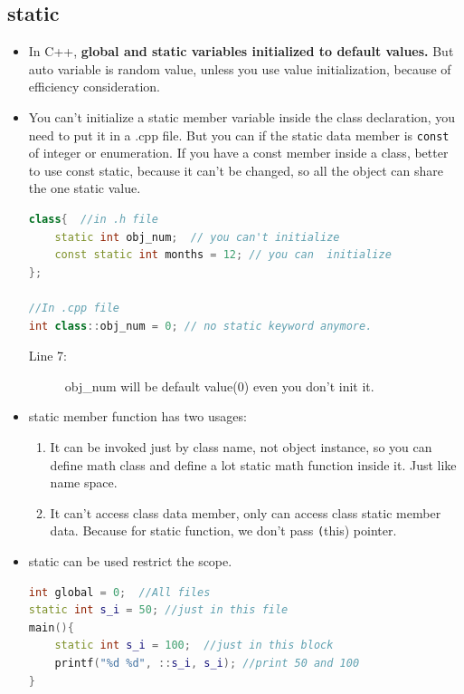 \documentclass[a4paper,11pt,twoside]{book}
\begin{document}
\subsection{static}
\begin{itemize}
	\item In C++, \textbf{global and static variables initialized to default values.}  But auto variable is random value, unless you use value initialization, because of efficiency consideration. 
	
	\item You can't initialize a static member variable inside the class declaration, you need to put it in a .cpp file.   But you can if the static data member is \texttt{const} of integer or enumeration. If you have a const member inside a class, better to use const static, because it can't be changed, so all the object can share the one static value.
\begin{lstlisting}[frame=single, language=c++]
class{  //in .h file
	static int obj_num;  // you can't initialize
	const static int months = 12; // you can  initialize
};
	
//In .cpp file
int class::obj_num = 0; // no static keyword anymore.

\end{lstlisting}
\begin{description}
	\item[Line 7:] obj\_num will be default value(0) even you don't init it.
\end{description}
	
	\item static member function has two usages:
	\begin{enumerate}
		\item It can be invoked just by class name, not object instance, so you can define math class and define a lot static math function inside it.  Just like name space.
		
		\item It can't access class data member, only can access class static member data. Because for static function, we don't pass \texttt(this) pointer.
	\end{enumerate}
	
	\item static can be used restrict the scope.
\begin{lstlisting}[frame=single, language=c++]
int global = 0;  //All files
static int s_i = 50; //just in this file
main(){
	static int s_i = 100;  //just in this block
	printf("%d %d", ::s_i, s_i); //print 50 and 100
}
\end{lstlisting}
\begin{description}


\end{description}
\end{itemize}
\end{document}
